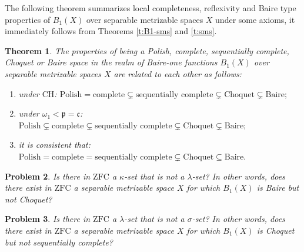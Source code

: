 \documentclass[preprint,11pt]{elsarticle}
\newtheorem{theorem}{Theorem}[section]
\newtheorem{problem}[theorem]{Problem}
\numberwithin{equation}{section}
\numberwithin{theorem}{section}
\def\om{\omega}
\begin{document}
The following theorem summarizes local completeness, reflexivity and Baire type properties of $B_1(X)$ over separable metrizable spaces $X$ under some axioms, it immediately follows from Theorems \ref{t:B1-sms} and \ref{t:sms}.

\begin{theorem}\label{t:sms-B1}
The properties of being a Polish, complete, sequentially complete, Choquet or Baire space in the realm of Baire-one functions $B_1(X)$ over separable metrizable spaces $X$ are related to each other as follows:
\begin{enumerate}
\item[{\rm (i)}] under $\mathrm{CH}$: \hspace{2mm}
$
\mbox{Polish}  = \mbox{complete} \subsetneq  \mbox{sequentially complete}  \subsetneq  \mbox{Choquet}
 \subsetneq \mbox{Baire};
$
\item[{\rm (ii)}] under  $\om_1<\mathfrak{p}=\mathfrak{c}$: \hspace{2mm}
$
\mbox{Polish} \subsetneq \mbox{complete} \subsetneq  \mbox{sequentially complete}  \subsetneq  \mbox{Choquet}
 \subsetneq \mbox{Baire};
$
\item[{\rm (iii)}]
it is consistent that:  \hspace{2mm}
$
\mbox{Polish}  = \mbox{complete} = \mbox{sequentially complete}   \subsetneq  \mbox{Choquet}
 \subseteq \mbox{Baire}.
$
\end{enumerate}
\end{theorem}

\begin{problem}
Is there in $\mathrm{ZFC}$ a $\kappa$-set that is not a $\lambda$-set? In other words, does there exist in $\mathrm{ZFC}$ a separable  metrizable space $X$ for which $B_1(X)$ is Baire but not Choquet?
\end{problem}


\begin{problem}
Is there in $\mathrm{ZFC}$ a $\lambda$-set that is not a $\sigma$-set? In other words, does there exist in $\mathrm{ZFC}$ a separable  metrizable space $X$ for which $B_1(X)$ is Choquet but not sequentially complete?
\end{problem}
\end{document}
